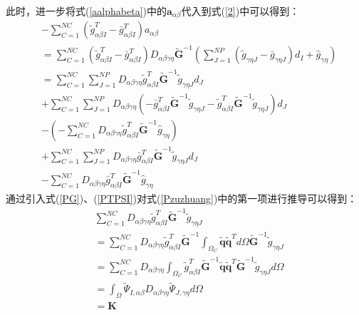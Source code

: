 \newpage
此时，进一步将式(\ref{aalphabeta})中的$\pmb{a}_{\alpha\beta}$代入到式(\ref{2})中可以得到：
\begin{equation}
\begin{split}\label{Pzuzhuang}
    &-\sum_{C=1}^{N\!C}(\tilde{g}_{\alpha\beta I}^T-\bar{g}_{\alpha\beta I}^T)a_{\alpha\beta}\\
    &=\sum_{C=1}^{N\!C}(\tilde{g}_{\alpha\beta I}^T-\bar{g}_{\alpha\beta I}^T)D_{\alpha\beta\gamma\eta}\tilde{\pmb{G}}^{-1}(\sum_{J=1}^{N\!P}(\tilde{g}_{\gamma\eta J}-\bar{g}_{\gamma\eta J})d_I+\hat{g}_{\gamma\eta})\\
    &=\sum_{C=1}^{N\!C}\sum_{J=1}^{N\!P}D_{\alpha\beta\gamma\eta}\tilde{g}_{\alpha\beta I}^T\tilde{\pmb G}^{-1}\tilde{g}_{\gamma\eta J}d_J\\
    &+\sum_{C=1}^{N\!C}\sum_{J=1}^{N\!P}D_{\alpha\beta\gamma\eta}(-\bar{g}_{\alpha\beta I}^T\tilde{\pmb G}^{-1}\tilde{g}_{\gamma\eta J}-\tilde{g}_{\alpha\beta I}^T\tilde{\pmb G}^{-1}\tilde{g}_{\gamma\eta J})d_J\\
    &-(-\sum_{C=1}^{N\!C}D_{\alpha\beta\gamma\eta}\tilde{g}_{\alpha\beta I}^T\tilde{\pmb G}^{-1}\hat{g}_{\gamma\eta })\\
    &+\sum_{C=1}^{N\!C}\sum_{J=1}^{N\!P}D_{\alpha\beta\gamma\eta}\bar{g}_{\alpha\beta I}^T\tilde{\pmb G}^{-1}\tilde{g}_{\gamma\eta J}d_J\\
    &-\sum_{C=1}^{N\!C}D_{\alpha\beta\gamma\eta}\bar{g}_{\alpha\beta I}^T\tilde{\pmb G}^{-1}\hat{g}_{\gamma\eta }
\end{split}
\end{equation}
通过引入式(\ref{PG})、(\ref{PTPSI})对式(\ref{Pzuzhuang})中的第一项进行推导可以得到：
\begin{equation}
\begin{split}
    &\sum_{C=1}^{N\!C}D_{\alpha\beta\gamma\eta}\tilde{g}_{\alpha\beta I}^T\tilde{\pmb G}^{-1}\tilde{g}_{\gamma\eta J}\\
    &=\sum_{C=1}^{N\!C}D_{\alpha\beta\gamma\eta}\tilde{g}_{\alpha\beta I}^T\tilde{\pmb G}^{-1}\int_{\Omega_C}\tilde{\pmb q}\tilde{\pmb q}^Td\Omega\tilde{\pmb G}^{-1}\tilde{g}_{\gamma\eta J}\\
    &=\sum_{C=1}^{N\!C}D_{\alpha\beta\gamma\eta}\int_{\Omega_C}\tilde{g}_{\alpha\beta I}^T\tilde{\pmb G}^{-1}\tilde{\pmb q}\tilde{\pmb q}^T\tilde{\pmb G}^{-1}\tilde{g}_{\gamma\eta J}d\Omega \\
    &=\int_{\Omega}\tilde{\Psi}_{I,\alpha\beta}D_{\alpha\beta\gamma\eta}\tilde{\Psi}_{J,\gamma\eta}d\Omega \\
    &=\pmb{K}
\end{split}
\end{equation}
